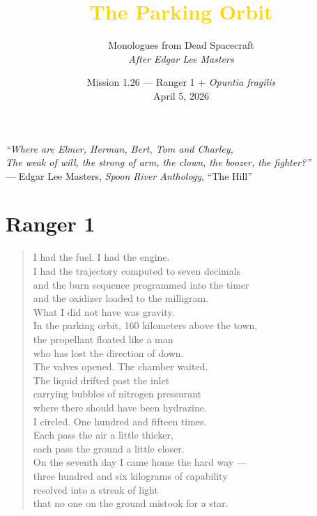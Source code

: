 \documentclass[12pt]{article}
\title{\textcolor{gold}{The Parking Orbit}}
\author{Monologues from Dead Spacecraft\\[0.3em]\small\textit{After Edgar Lee Masters}}
\date{Mission 1.26 --- Ranger 1 + \textit{Opuntia fragilis}\\April 5, 2026}
\begin{document}
\maketitle

\begin{center}
\textcolor{cactus}{\textit{``Where are Elmer, Herman, Bert, Tom and Charley,\\
The weak of will, the strong of arm, the clown, the boozer, the fighter?''}}\\
\small --- Edgar Lee Masters, \textit{Spoon River Anthology}, ``The Hill''
\end{center}

\vspace{1.5em}

\section*{\textcolor{failure}{Ranger 1}}

\begin{verse}
I had the fuel. I had the engine.\\
I had the trajectory computed to seven decimals\\
and the burn sequence programmed into the timer\\
and the oxidizer loaded to the milligram.\\
What I did not have was gravity.\\
In the parking orbit, 160 kilometers above the town,\\
the propellant floated like a man\\
who has lost the direction of down.\\
The valves opened. The chamber waited.\\
The liquid drifted past the inlet\\
carrying bubbles of nitrogen pressurant\\
where there should have been hydrazine.\\
I circled. One hundred and fifteen times.\\
Each pass the air a little thicker,\\
each pass the ground a little closer.\\
On the seventh day I came home the hard way ---\\
three hundred and six kilograms of capability\\
resolved into a streak of light\\
that no one on the ground mistook for a star.
\end{verse}
\end{document}
